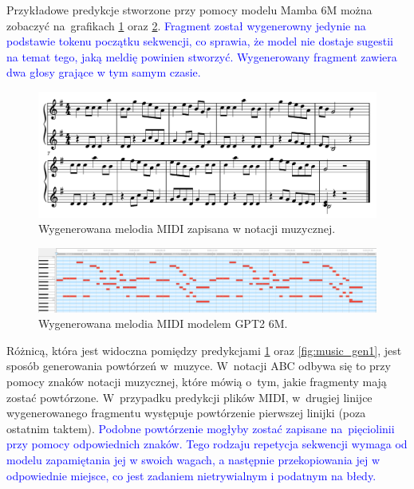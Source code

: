 \documentclass[data-science]{agh-wi} %
\begin{document}
Przykładowe predykcje stworzone przy pomocy modelu Mamba 6M można zobaczyć na~grafikach \ref*{fig:music_genMIDI_notes} oraz \ref*{fig:music_genMIDI}. \textcolor{blue}{Fragment został wygenerowny jedynie na podstawie tokenu początku sekwencji, co sprawia, że model nie dostaje sugestii na temat tego, jaką meldię powinien stworzyć. Wygenerowany fragment zawiera dwa głosy grające w tym samym czasie.}

\begin{figure}[ht!]
    \begin{center}
        \includegraphics[width=0.9\linewidth]{./img/35.pdf}
    \end{center}
    \caption{Wygenerowana melodia MIDI zapisana w notacji muzycznej.}\label{fig:music_genMIDI_notes}
\end{figure}

\begin{figure}[ht!]
    \begin{center}
        \includegraphics[width=0.9\linewidth]{./img/midi_generated.png}
    \end{center}
    \caption{Wygenerowana melodia MIDI modelem GPT2 6M.}\label{fig:music_genMIDI}
\end{figure}

Różnicą, która jest widoczna pomiędzy predykcjami \ref*{fig:music_genMIDI_notes} oraz \ref*{fig:music_gen1}, jest sposób generowania powtórzeń w~muzyce. W~notacji ABC odbywa się to przy pomocy znaków notacji muzycznej, które mówią o~tym, jakie fragmenty mają zostać powtórzone. W~przypadku predykcji plików MIDI, w~drugiej linijce wygenerowanego fragmentu występuje powtórzenie pierwszej linijki (poza ostatnim taktem). \textcolor{blue}{Podobne powtórzenie mogłyby zostać zapisane na~pięciolinii przy pomocy odpowiednich znaków. Tego rodzaju repetycja sekwencji wymaga od modelu zapamiętania jej w swoich wagach, a następnie przekopiowania jej w odpowiednie miejsce, co jest zadaniem nietrywialnym i podatnym na błedy.}
\end{document}
